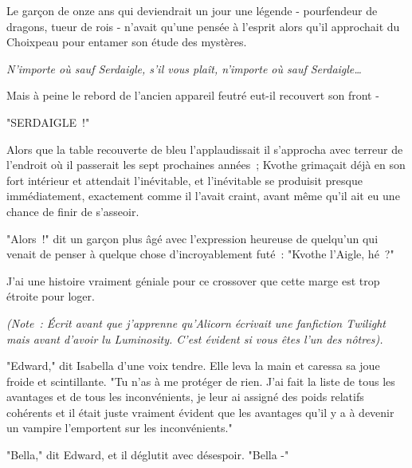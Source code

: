
Le garçon de onze ans qui deviendrait un jour une légende - pourfendeur de dragons, tueur de rois - n'avait qu'une pensée à l'esprit alors qu'il approchait du Choixpeau pour entamer son étude des mystères.

\emph{N'importe où sauf Serdaigle, s'il vous plaît, n'importe où sauf Serdaigle…}

Mais à peine le rebord de l'ancien appareil feutré eut-il recouvert son front -

"SERDAIGLE~!"

Alors que la table recouverte de bleu l'applaudissait il s'approcha avec terreur de l'endroit où il passerait les sept prochaines années~; Kvothe grimaçait déjà en son fort intérieur et attendait l'inévitable, et l'inévitable se produisit presque immédiatement, exactement comme il l'avait craint, avant même qu'il ait eu une chance de finir de s'asseoir.

"Alors~!" dit un garçon plus âgé avec l'expression heureuse de quelqu'un qui venait de penser à quelque chose d'incroyablement futé~: "Kvothe l'Aigle, hé~?" \footnotemark{}


J'ai une histoire vraiment géniale pour ce crossover que cette marge est trop étroite pour loger.


\emph{(Note~: Écrit avant que j'apprenne qu'Alicorn écrivait une fanfiction Twilight mais avant d'avoir lu {Luminosity}. C'est évident si vous êtes l'un des nôtres).}

"Edward," dit Isabella d'une voix tendre. Elle leva la main et caressa sa joue froide et scintillante. "Tu n'as à me protéger de rien. J'ai fait la liste de tous les avantages et de tous les inconvénients, je leur ai assigné des poids relatifs cohérents et il était juste vraiment évident que les avantages qu'il y a à devenir un vampire l'emportent sur les inconvénients."

"Bella," dit Edward, et il déglutit avec désespoir. "Bella -"

